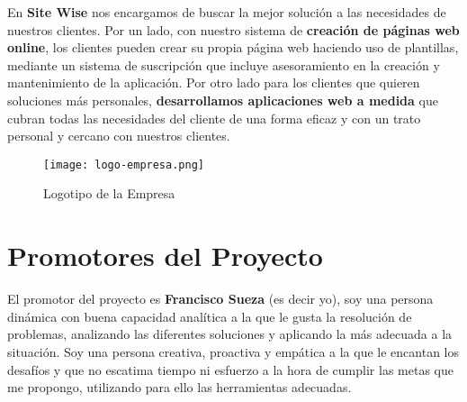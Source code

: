En \textbf{Site Wise} nos encargamos de buscar la mejor solución a las necesidades de nuestros clientes. Por un lado, con nuestro sistema de \textbf{creación de páginas web online}, los clientes pueden crear su propia página web haciendo uso de plantillas, mediante un sistema de suscripción que incluye asesoramiento en la creación y mantenimiento de la aplicación. Por otro lado para los clientes que quieren soluciones más personales, \textbf{desarrollamos aplicaciones web a medida} que cubran todas las necesidades del cliente de una forma eficaz y con un trato personal y cercano con nuestros clientes.

    \begin{figure}[H]
    \centering
    \texttt{[image: logo-empresa.png]}
    \caption{Logotipo de la Empresa}
\end{figure}

\section{Promotores del Proyecto}
El promotor del proyecto es \textbf{Francisco Sueza} (es decir yo), soy una persona dinámica con buena capacidad analítica a la que le gusta la resolución de problemas, analizando las diferentes soluciones y aplicando la más adecuada a la situación. Soy una persona creativa, proactiva y empática a la que le encantan los desafíos y que no escatima tiempo ni esfuerzo a la hora de cumplir las metas que me propongo, utilizando para ello las herramientas adecuadas.

